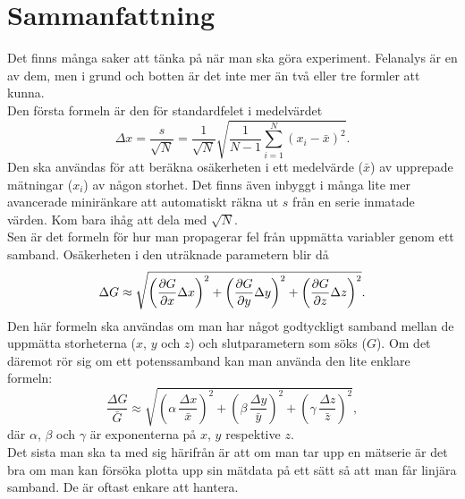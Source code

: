\documentclass[11pt,a4paper, swedish
]{article}
\begin{document}

% 

\newpage
\section{Sammanfattning}
Det finns många saker att tänka på när man ska göra
experiment. Felanalys är en av dem, men i grund och botten är det inte
mer än två eller tre formler att kunna. 
\\[16pt]
Den första formeln är den för standardfelet i medelvärdet
\[
\Delta{x} = \frac{s}{\sqrt{N}} 
= \frac{1}{\sqrt{N}}\sqrt{\frac{1}{N-1}\sum_{i=1}^N (x_i-\bar{x})^2}.
\]
Den ska användas för att beräkna osäkerheten i ett medelvärde
($\bar{x}$) av upprepade mätningar ($x_i$) av någon storhet. Det finns
även inbyggt i många lite mer avancerade miniränkare att automatiskt
räkna ut $s$ från en serie inmatade värden. Kom bara ihåg att dela med
$\sqrt{N}$. 
\\[16pt]
Sen är det formeln för hur man propagerar fel från uppmätta variabler
genom ett samband. Osäkerheten i den uträknade parametern blir då
\[
\Delta{G} \approx \sqrt{
\left(\pdv{G}{x}\Delta{x}\right)^2
+\left(\pdv{G}{y}\Delta{y}\right)^2
+\left(\pdv{G}{z}\Delta{z}\right)^2
}.
\]
Den här formeln ska användas om man har något godtyckligt samband
mellan de uppmätta storheterna ($x$, $y$ och $z$) och slutparametern
som söks ($G$). Om det däremot rör sig om ett potenssamband kan man
använda den lite enklare formeln:
\[
\frac{\Delta{G}}{\bar{G}} \approx \sqrt{
\left(\alpha\,\frac{\Delta{x}}{\bar{x}}\right)^2
+\left(\beta\,\frac{\Delta{y}}{\bar{y}}\right)^2
+\left(\gamma\,\frac{\Delta{z}}{\bar{z}}\right)^2
},
\]
där $\alpha$, $\beta$ och $\gamma$ är exponenterna på $x$, $y$
respektive $z$.
\\[16pt]
Det sista man ska ta med sig härifrån är att om man tar upp en
mätserie är det bra om man kan försöka plotta upp sin mätdata på ett
sätt så att man får linjära samband. De är oftast enkare att hantera. 
\end{document}
